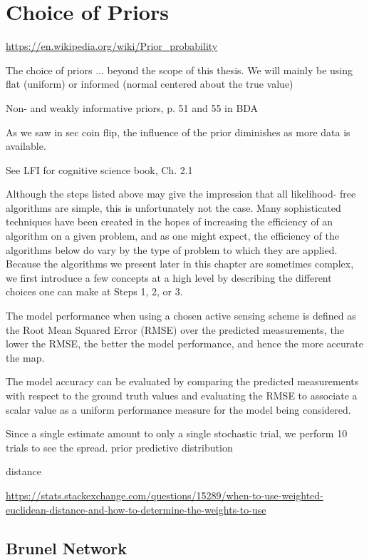 \section{Choice of Priors}

\url{https://en.wikipedia.org/wiki/Prior_probability}


The choice of priors ... beyond the scope of this thesis. We will mainly be using flat (uniform) or informed (normal centered about the true value)

Non- and weakly informative priors, p. 51 and 55 in BDA

As we saw in sec coin flip, the influence of the prior diminishes as more data is available.  


See LFI for cognitive science book, Ch. 2.1

Although the steps listed above may give the impression that all likelihood- free algorithms are simple, this is unfortunately not the case. Many sophisticated techniques have been created in the hopes of increasing the efficiency of an algorithm on a given problem, and as one might expect, the efficiency of the algorithms below do vary by the type of problem to which they are applied. Because the algorithms we present later in this chapter are sometimes complex, we first introduce a few concepts at a high level by describing the different choices one can make at Steps 1, 2, or 3.


The model performance when using a chosen active sensing scheme is defined as the Root Mean Squared Error (RMSE) over the predicted measurements, the lower the RMSE, the better the model performance, and hence the more accurate the map.

The model accuracy can be evaluated by comparing the predicted measurements with respect to the ground truth values and evaluating the RMSE to associate a scalar value as a uniform performance measure for the model being considered.


Since a single estimate amount to only a single stochastic trial, we perform 10 trials to see the spread. prior predictive distribution 


distance 

\url{https://stats.stackexchange.com/questions/15289/when-to-use-weighted-euclidean-distance-and-how-to-determine-the-weights-to-use}


\subsection{Brunel Network}


